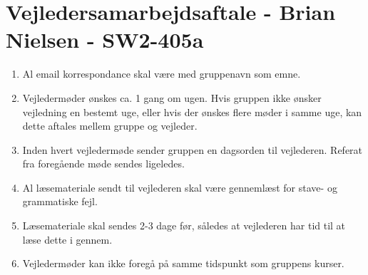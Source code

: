 \documentclass{article}
\begin{document}
	\section*{Vejledersamarbejdsaftale - Brian Nielsen - SW2-405a}

	\begin{enumerate}

		\item Al email korrespondance skal være med gruppenavn som emne.

		\item Vejledermøder ønskes ca. 1 gang om ugen. Hvis gruppen ikke ønsker vejledning en bestemt uge, eller hvis der ønskes flere møder i samme uge, kan dette aftales mellem gruppe og vejleder.

		\item Inden hvert vejledermøde sender gruppen en dagsorden til vejlederen. Referat fra foregående møde sendes ligeledes.

		\item Al læsemateriale sendt til vejlederen skal være gennemlæst for stave- og grammatiske fejl.

		\item Læsemateriale skal sendes 2-3 dage før, således at vejlederen har tid til at læse dette i gennem.

		\item Vejledermøder kan ikke foregå på samme tidspunkt som gruppens kurser.

	\end{enumerate}
\end{document}
